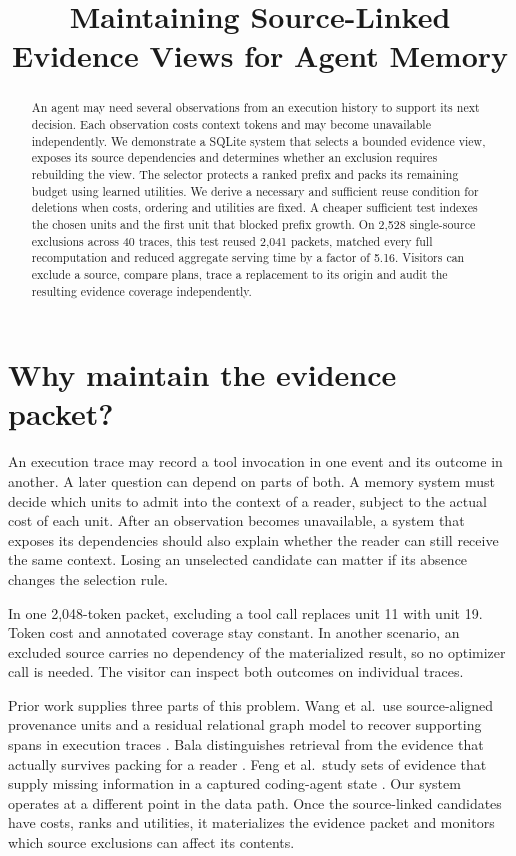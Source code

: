 \documentclass[conference]{IEEEtran}
\title{Maintaining Source-Linked Evidence Views for Agent Memory}
\author{}
\begin{document}
\maketitle
\begin{abstract}
An agent may need several observations from an execution history to support its next decision. Each observation costs context tokens and may become unavailable independently. We demonstrate a SQLite system that selects a bounded evidence view, exposes its source dependencies and determines whether an exclusion requires rebuilding the view. The selector protects a ranked prefix and packs its remaining budget using learned utilities. We derive a necessary and sufficient reuse condition for deletions when costs, ordering and utilities are fixed. A cheaper sufficient test indexes the chosen units and the first unit that blocked prefix growth. On 2,528 single-source exclusions across 40 traces, this test reused 2,041 packets, matched every full recomputation and reduced aggregate serving time by a factor of 5.16. Visitors can exclude a source, compare plans, trace a replacement to its origin and audit the resulting evidence coverage independently.
\end{abstract}

\section{Why maintain the evidence packet?}

An execution trace may record a tool invocation in one event and its outcome in another. A later question can depend on parts of both. A memory system must decide which units to admit into the context of a reader, subject to the actual cost of each unit. After an observation becomes unavailable, a system that exposes its dependencies should also explain whether the reader can still receive the same context. Losing an unselected candidate can matter if its absence changes the selection rule.

In one 2,048-token packet, excluding a tool call replaces unit 11 with unit 19. Token cost and annotated coverage stay constant. In another scenario, an excluded source carries no dependency of the materialized result, so no optimizer call is needed. The visitor can inspect both outcomes on individual traces.

Prior work supplies three parts of this problem. Wang et al.\ use source-aligned provenance units and a residual relational graph model to recover supporting spans in execution traces \cite{wang}. Bala distinguishes retrieval from the evidence that actually survives packing for a reader \cite{bala}. Feng et al.\ study sets of evidence that supply missing information in a captured coding-agent state \cite{feng}. Our system operates at a different point in the data path. Once the source-linked candidates have costs, ranks and utilities, it materializes the evidence packet and monitors which source exclusions can affect its contents.
\end{document}

